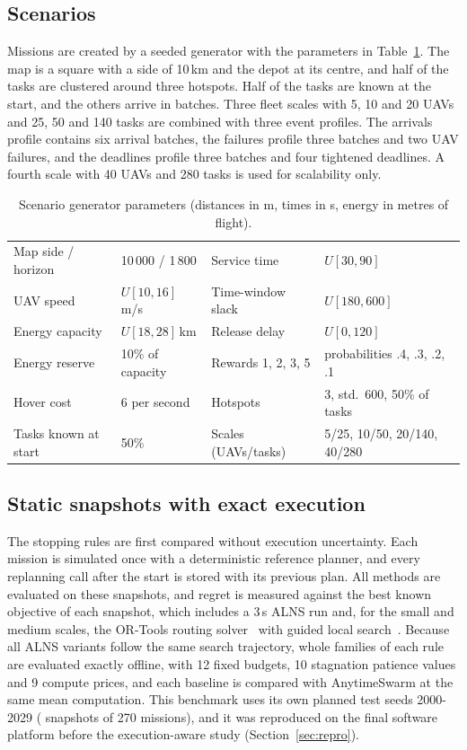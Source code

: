 \subsection{Scenarios}
Missions are created by a seeded generator with the parameters in Table~\ref{tab:params}. The map is a square with a
side of 10\,km and the depot at its centre, and half of the tasks are clustered around three hotspots. Half of the tasks
are known at the start, and the others arrive in batches. Three fleet scales with 5, 10 and 20 UAVs and 25, 50 and 140
tasks are combined with three event profiles. The arrivals profile contains six arrival batches, the failures profile
three batches and two UAV failures, and the deadlines profile three batches and four tightened deadlines. A fourth scale
with 40 UAVs and 280 tasks is used for scalability only.

\begin{table}[t]
\caption{Scenario generator parameters (distances in m, times in s, energy in metres of flight).}\label{tab:params}
\centering\small
\setlength{\tabcolsep}{4pt}
\begin{tabular}{ll@{\qquad}ll}
\toprule
Map side / horizon & 10\,000 / 1\,800 & Service time & $U[30,90]$ \\
UAV speed & $U[10,16]$\,m/s & Time-window slack & $U[180,600]$ \\
Energy capacity & $U[18,28]$\,km & Release delay & $U[0,120]$ \\
Energy reserve & 10\% of capacity & Rewards 1, 2, 3, 5 & probabilities .4, .3, .2, .1 \\
Hover cost & 6 per second & Hotspots & 3, std.\ 600, 50\% of tasks \\
Tasks known at start & 50\% & Scales (UAVs/tasks) & 5/25, 10/50, 20/140, 40/280 \\
\bottomrule
\end{tabular}
\end{table}

\subsection{Static snapshots with exact execution}
The stopping rules are first compared without execution uncertainty. Each mission is simulated once with a
deterministic reference planner, and every replanning call after the start is stored with its previous plan. All
methods are evaluated on these snapshots, and regret is measured against the best known objective of each snapshot,
which includes a 3\,s ALNS run and, for the small and medium scales, the OR-Tools routing solver~\cite{ortools} with
guided local search~\cite{voudouris1999gls}. Because all ALNS variants follow the same search trajectory, whole families
of each rule are evaluated exactly offline, with 12 fixed budgets, 10 stagnation patience values and 9 compute prices,
and each baseline is compared with AnytimeSwarm at the same mean computation. This benchmark uses its own planned
test seeds 2000-2029 ( snapshots of 270 missions), and it was reproduced on the final software platform
before the execution-aware study (Section~\ref{sec:repro}).

